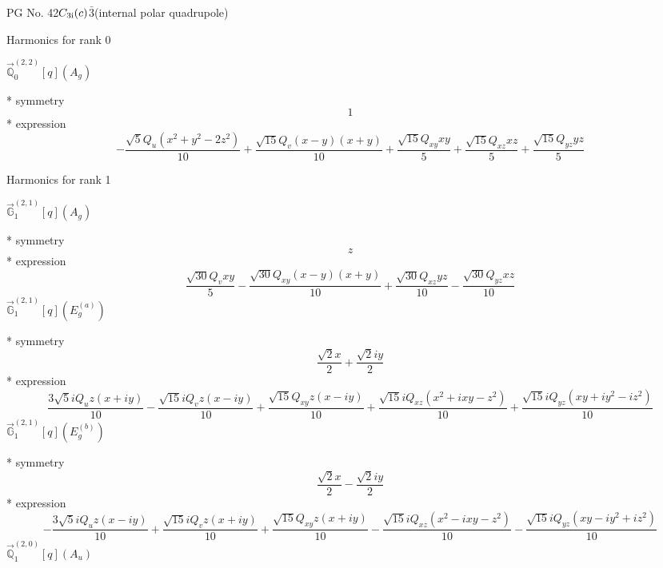 \documentclass[fleqn,8pt]{jsarticle}
\begin{document}
\setcounter{MaxMatrixCols}{32}

\renewcommand{\tablename}{Table~}
\renewcommand{\figurename}{Figure~}
\begin{center}
\LARGE
PG No. 42\quad$C_{\rm 3i}(c)$\quad$\bar{3}$\quad[ trigonal ] (internal polar quadrupole)
\end{center}

\noindent * Harmonics for rank 0

\noindent\quad $\vec{\mathbb{Q}}_{0}^{(2,2)}[q](A_{g})$

\noindent\quad ** symmetry
\begin{dmath*}
1
\end{dmath*}
\noindent\quad ** expression
\begin{dmath*}
- \frac{\sqrt{5} Q_{u} \left(x^{2} + y^{2} - 2 z^{2}\right)}{10} + \frac{\sqrt{15} Q_{v} \left(x - y\right) \left(x + y\right)}{10} + \frac{\sqrt{15} Q_{xy} x y}{5} + \frac{\sqrt{15} Q_{xz} x z}{5} + \frac{\sqrt{15} Q_{yz} y z}{5}
\end{dmath*}

\noindent * Harmonics for rank 1

\noindent\quad $\vec{\mathbb{G}}_{1}^{(2,1)}[q](A_{g})$

\noindent\quad ** symmetry
\begin{dmath*}
z
\end{dmath*}
\noindent\quad ** expression
\begin{dmath*}
\frac{\sqrt{30} Q_{v} x y}{5} - \frac{\sqrt{30} Q_{xy} \left(x - y\right) \left(x + y\right)}{10} + \frac{\sqrt{30} Q_{xz} y z}{10} - \frac{\sqrt{30} Q_{yz} x z}{10}
\end{dmath*}
\noindent\quad $\vec{\mathbb{G}}_{1}^{(2,1)}[q](E_{g}^{(a)})$

\noindent\quad ** symmetry
\begin{dmath*}
\frac{\sqrt{2} x}{2} + \frac{\sqrt{2} i y}{2}
\end{dmath*}
\noindent\quad ** expression
\begin{dmath*}
\frac{3 \sqrt{5} i Q_{u} z \left(x + i y\right)}{10} - \frac{\sqrt{15} i Q_{v} z \left(x - i y\right)}{10} + \frac{\sqrt{15} Q_{xy} z \left(x - i y\right)}{10} + \frac{\sqrt{15} i Q_{xz} \left(x^{2} + i x y - z^{2}\right)}{10} + \frac{\sqrt{15} i Q_{yz} \left(x y + i y^{2} - i z^{2}\right)}{10}
\end{dmath*}
\noindent\quad $\vec{\mathbb{G}}_{1}^{(2,1)}[q](E_{g}^{(b)})$

\noindent\quad ** symmetry
\begin{dmath*}
\frac{\sqrt{2} x}{2} - \frac{\sqrt{2} i y}{2}
\end{dmath*}
\noindent\quad ** expression
\begin{dmath*}
- \frac{3 \sqrt{5} i Q_{u} z \left(x - i y\right)}{10} + \frac{\sqrt{15} i Q_{v} z \left(x + i y\right)}{10} + \frac{\sqrt{15} Q_{xy} z \left(x + i y\right)}{10} - \frac{\sqrt{15} i Q_{xz} \left(x^{2} - i x y - z^{2}\right)}{10} - \frac{\sqrt{15} i Q_{yz} \left(x y - i y^{2} + i z^{2}\right)}{10}
\end{dmath*}
\noindent\quad $\vec{\mathbb{Q}}_{1}^{(2,0)}[q](A_{u})$
\end{document}
